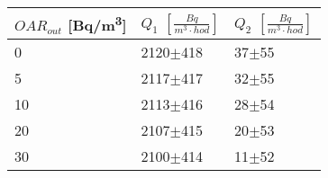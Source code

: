 \begin{tabular}{lll}
\toprule
$OAR_{out}$ [\si{Bq/m^3}] & $Q_1$ $\left[\si{\frac{Bq}{m^3\cdot hod}}\right]$ & $Q_2$ $\left[\si{\frac{Bq}{m^3\cdot hod}}\right]$ \\
\midrule
0  &                                        2120$\pm$418 &                                           37$\pm$55 \\
5  &                                        2117$\pm$417 &                                           32$\pm$55 \\
10 &                                        2113$\pm$416 &                                           28$\pm$54 \\
20 &                                        2107$\pm$415 &                                           20$\pm$53 \\
30 &                                        2100$\pm$414 &                                           11$\pm$52 \\
\bottomrule
\end{tabular}
